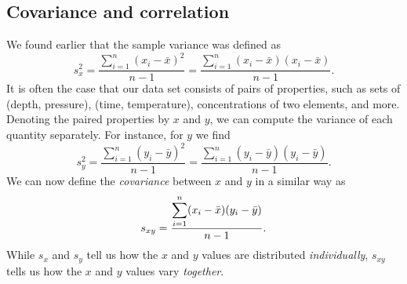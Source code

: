 \subsection{Covariance and correlation}
\label{sc:cc}
We found earlier that the sample variance was defined as 
\begin{equation}
s^2_x = \frac{\displaystyle \sum^n_{i=1} (x_i - \bar{x})^2}{n-1} =
 \frac{\displaystyle \sum^n_{i=1} (x_i - \bar{x})(x_i - \bar{x}) }{n-1}.
\end{equation}	 
It is often the case that our data set consists of pairs of properties, such as sets of (depth, pressure), 
(time, temperature), concentrations of two elements, and more.  Denoting the paired properties by $x$ and $y$, 
we can compute the variance of each quantity separately.  For instance, for $y$ we find
\begin{equation}
s^2_y = \frac{\displaystyle \sum ^n_{i=1} (y_i - \bar{y})^2} {n-1}=
\frac{\displaystyle \sum^n_{i=1} (y_i - \bar{y}) (y_i - \bar{y})} {n-1}.
\end{equation}
We can now define the \emph{covariance} between $x$ and $y$ in a similar way as
\begin{equation}
	\index{Sample!covariance}
	\index{Covariance}
s_{xy} =  \frac{\displaystyle \sum^n_{i=1} (x_i - \bar{x})(y_i - \bar{y})} {n-1}.
\end{equation}
While $s_x$ and $s_y$ tell us how the $x$ and $y$ values are distributed \emph{individually}, $s_{xy}$  tells us how 
the $x$ and $y$ values vary \emph{together}.

